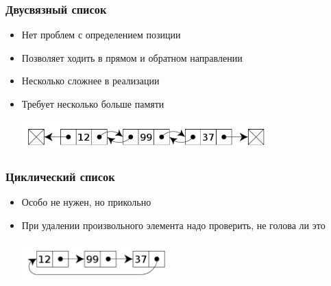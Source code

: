 \documentclass{../../slides-style}
\begin{document}
	\begin{frame}
		\frametitle{Двусвязный список}
		\begin{itemize}
			\item Нет проблем с определением позиции
			\item Позволяет ходить в прямом и обратном направлении
			\item Несколько сложнее в реализации
			\item Требует несколько больше памяти
			\begin{center}
				\includegraphics[width=0.75\textwidth]{double-linked-list.png}
			\end{center}
		\end{itemize}
	\end{frame}

	\begin{frame}
		\frametitle{Циклический список}
		\begin{itemize}
			\item Особо не нужен, но прикольно
			\item При удалении произвольного элемента надо проверить, не голова ли это
			\begin{center}
				\includegraphics[width=0.45\textwidth]{cyclic-list.png}
			\end{center}
		\end{itemize}
	\end{frame}
	
\end{document}
